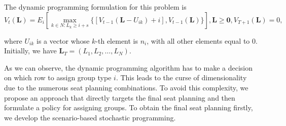 The dynamic programming formulation for this problem is
$$V_{t}(\mathbf{L}) = E_{i} \left[ \max_{k \in N: L_k \geq i + s} \{ {[V_{t-1}(\mathbf{L}- U_{ik})+ i]}, {V_{t-1}(\mathbf{L})}\} \right], \mathbf{L} \geq \mathbf{0}, V_{T+1}(\mathbf{L}) = 0,$$

where $U_{ik}$ is a vector whose $k$-th element is $n_i$, with all other elements equal to 0. Initially, we have $\mathbf{L}_{T} = (L_1, L_2, \ldots, L_{N})$. 


As we can observe, the dynamic programming algorithm has to make a decision on which row to assign group type $i$. This leads to the curse of dimensionality due to the numerous seat planning combinations. To avoid this complexity, we propose an approach that directly targets the final seat planning and then formulate a policy for assigning groups. To obtain the final seat planning firstly, we develop the scenario-based stochastic programming.








